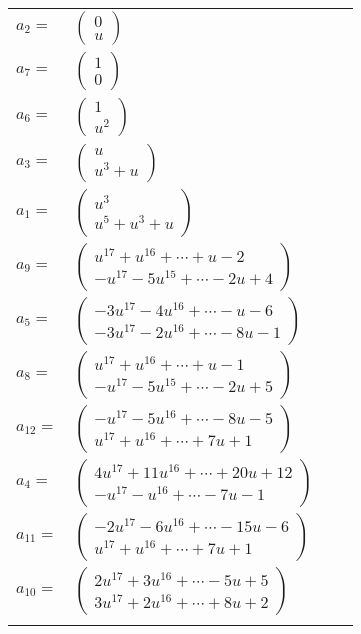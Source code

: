 \documentclass[1p]{elsarticle_modified}
\theoremstyle{definition}
\begin{document}
\begin{tabular}{m{7pt} m{180pt} m{7pt} m{180pt} }
\flushright $a_{2}=$&$\begin{pmatrix}0\\u\end{pmatrix}$ \\
\flushright $a_{7}=$&$\begin{pmatrix}1\\0\end{pmatrix}$ \\
\flushright $a_{6}=$&$\begin{pmatrix}1\\u^2\end{pmatrix}$ \\
\flushright $a_{3}=$&$\begin{pmatrix}u\\u^3+u\end{pmatrix}$ \\
\flushright $a_{1}=$&$\begin{pmatrix}u^3\\u^5+u^3+u\end{pmatrix}$ \\
\flushright $a_{9}=$&$\begin{pmatrix}u^{17}+u^{16}+\cdots+u-2\\- u^{17}-5 u^{15}+\cdots-2 u+4\end{pmatrix}$ \\
\flushright $a_{5}=$&$\begin{pmatrix}-3 u^{17}-4 u^{16}+\cdots- u-6\\-3 u^{17}-2 u^{16}+\cdots-8 u-1\end{pmatrix}$ \\
\flushright $a_{8}=$&$\begin{pmatrix}u^{17}+u^{16}+\cdots+u-1\\- u^{17}-5 u^{15}+\cdots-2 u+5\end{pmatrix}$ \\
\flushright $a_{12}=$&$\begin{pmatrix}- u^{17}-5 u^{16}+\cdots-8 u-5\\u^{17}+u^{16}+\cdots+7 u+1\end{pmatrix}$ \\
\flushright $a_{4}=$&$\begin{pmatrix}4 u^{17}+11 u^{16}+\cdots+20 u+12\\- u^{17}- u^{16}+\cdots-7 u-1\end{pmatrix}$ \\
\flushright $a_{11}=$&$\begin{pmatrix}-2 u^{17}-6 u^{16}+\cdots-15 u-6\\u^{17}+u^{16}+\cdots+7 u+1\end{pmatrix}$ \\
\flushright $a_{10}=$&$\begin{pmatrix}2 u^{17}+3 u^{16}+\cdots-5 u+5\\3 u^{17}+2 u^{16}+\cdots+8 u+2\end{pmatrix}$\\&\end{tabular}
\end{document}
